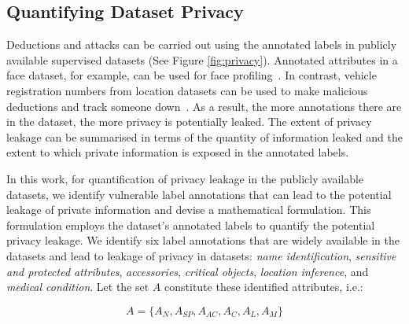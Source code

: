\documentclass[journal]{IEEEtran}
\begin{document}
\subsection{Quantifying Dataset Privacy} Deductions and attacks can be carried out using the annotated labels in publicly available supervised datasets (See Figure \ref{fig:privacy}). Annotated attributes in a face dataset, for example, can be used for face profiling~\cite{findface, facepp, socialmapper, gnanasekar2019face}. In contrast, vehicle registration numbers from location datasets can be used to make malicious deductions and track someone down~\cite{orekondy2017towards,5958033}. As a result, the more annotations there are in the dataset, the more privacy is potentially leaked. The extent of privacy leakage can be summarised in terms of the quantity of information leaked and the extent to which private information is exposed in the annotated labels. 

\noindent In this work, for quantification of privacy leakage in the publicly available datasets, we identify vulnerable label annotations that can lead to the potential leakage of private information and devise a mathematical formulation. This formulation employs the dataset's annotated labels to quantify the potential privacy leakage. We identify six label annotations that are widely available in the datasets and lead to leakage of privacy in datasets: \textit{name identification}, \textit{sensitive and protected attributes}, \textit{accessories}, \textit{critical objects}, \textit{location inference}, and \textit{medical condition}. 
Let the set $A$ constitute these identified attributes, i.e.:

\begin{equation}
    A = \{A_N, A_{SP}, A_{AC}, A_C, A_L, A_M\}
\end{equation}
\end{document}
